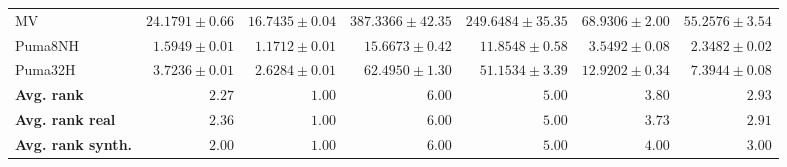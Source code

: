 \begin{table*}[!htbp]
{\begin{tabular}{lrrrrrr}
		MV & $24.1791 \pm 0.66$ & $\mathbf{16.7435 \pm 0.04}$ & $387.3366 \pm 42.35$ & $249.6484 \pm 35.35$ & $68.9306 \pm 2.00$ & $55.2576 \pm 3.54$\\
		Puma8NH & $1.5949 \pm 0.01$ & $\mathbf{1.1712 \pm 0.01}$ & $15.6673 \pm 0.42$ & $11.8548 \pm 0.58$ & $3.5492 \pm 0.08$ & $2.3482 \pm 0.02$\\
		Puma32H & $3.7236 \pm 0.01$ & $\mathbf{2.6284 \pm 0.01}$ & $62.4950 \pm 1.30$ & $51.1534 \pm 3.39$ & $12.9202 \pm 0.34$ & $7.3944 \pm 0.08$\\
		\midrule
		\textbf{{Avg. rank}} & $2.27$ & $\mathbf{1.00}$ & $6.00$ & $5.00$ & $3.80$ & $2.93$\\
		\textbf{{Avg. rank real}} & $2.36$ & $\mathbf{1.00}$ & $6.00$ & $5.00$ & $3.73$ & $2.91$\\
		\textbf{{Avg. rank synth.}} & $2.00$ & $\mathbf{1.00}$ & $6.00$ & $5.00$ & $4.00$ & $3.00$\\
		\bottomrule
	\end{tabular}}
\end{table*}
